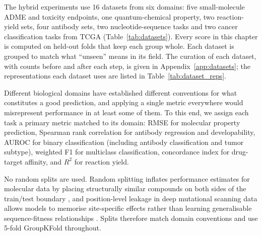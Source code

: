 The hybrid experiments use 16 datasets from six domains: five small-molecule ADME and toxicity endpoints, one quantum-chemical property, two reaction-yield sets, four antibody sets, two nucleotide-sequence tasks and two cancer classification tasks from TCGA (Table~\ref{tab:datasets}). Every score in this chapter is computed on held-out folds that keep each group whole. Each dataset is grouped to match what ``unseen'' means in its field. The curation of each dataset, with counts before and after each step, is given in Appendix~\ref{app:datasets}; the representations each dataset uses are listed in Table~\ref{tab:dataset_reps}.

Different biological domains have established different conventions for what constitutes a good prediction, and applying a single metric everywhere would misrepresent performance in at least some of them. To this end, we assign each task a primary metric matched to its domain: RMSE for molecular property prediction, Spearman rank correlation for antibody regression and developability, AUROC for binary classification (including antibody classification and tumor subtype), weighted F1 for multiclass classification, concordance index for drug-target affinity, and $R^2$ for reaction yield.

No random splits are used. Random splitting inflates performance estimates for molecular data by placing structurally similar compounds on both sides of the train/test boundary \citep{Yang2019, Wallach2018}, and position-level leakage in deep mutational scanning data allows models to memorise site-specific effects rather than learning generalisable sequence-fitness relationships \citep{Notin2023, Vieira2026}. Splits therefore match domain conventions and use 5-fold GroupKFold throughout.

